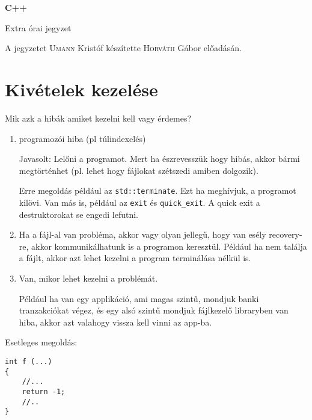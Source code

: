 \documentclass[a4paper,11.5pt]{article}
\begin{document}
	\setlength\parindent{0pt}
	\def\s{\hspace{0.2mm}\vphantom{\beta}}
	\def\Z{\mathbb{Z}}
	\def\Q{\mathbb{Q}}
	\def\R{\mathbb{R}}
	\def\C{\mathbb{C}}
	\def\N{\mathbb{N}}
	\def\Ra{\overline{\mathbb{R}}}
	
	\def\sume{\displaystyle\sum_{n=1}^{+\infty}}
	\def\sumn{\displaystyle\sum_{n=0}^{+\infty}}
	
	\def\narrow{\underset{n\rightarrow+\infty}{\longrightarrow}}
	\def\limn{\displaystyle\lim_{n\to +\infty}}
	\def\limx{\displaystyle\lim_{x\to +\infty}}
	
	\theoremstyle{definition}
	\newtheorem{theorem}{Tétel}[subsection] 
	
	\theoremstyle{definition}
	\newtheorem{definition}[theorem]{Definíció} 
	\newtheorem{example}[theorem]{Példa} 
	\newtheorem{task}[theorem]{Feladat} 
	\newtheorem{note}[theorem]{Megjegyzés}
	\begin{center}
		{\LARGE\textbf{C++}}
		
		{\Large Extra órai jegyzet}
	\end{center}
	A jegyzetet \textsc{Umann} Kristóf készítette \textsc{Horváth} Gábor  előadásán.
	\medskip
	
	\section{Kivételek kezelése}
	
	Mik azk a hibák amiket kezelni kell vagy érdemes? 
	
	\begin{enumerate}
		\item programozói hiba (pl túlindexelés)
		
		Javasolt: Lelőni a programot. Mert ha észrevesszük hogy hibás, akkor bármi megtörténhet (pl. lehet hogy fájlokat szétszedi amiben dolgozik).
		
		Erre megoldás például az \texttt{std::terminate}. Ezt ha meghívjuk, a programot kilövi. Van más is, például az \texttt{exit} és \texttt{quick\_exit}. A quick exit a destruktorokat se engedi lefutni.
		
		\item Ha a fájl-al van probléma, akkor vagy olyan jellegű, hogy van esély recovery-re, akkor kommunikálhatunk is a programon keresztül. Például ha nem találja a fájlt, akkor azt lehet kezelni a program terminálása nélkül is.
		
		\item Van, mikor lehet kezelni a problémát. 
		
		Például ha van egy applikáció, ami magas szintű, mondjuk banki tranzakciókat végez, és egy alsó szintű mondjuk fájlkezelő libraryben van hiba, akkor azt valahogy vissza kell vinni az app-ba.
		
	\end{enumerate}
		Esetleges megoldás:
		\begin{lstlisting}
int f (...)
{
	//...
	return -1;
	//..
}
		\end{lstlisting}
\end{document}

